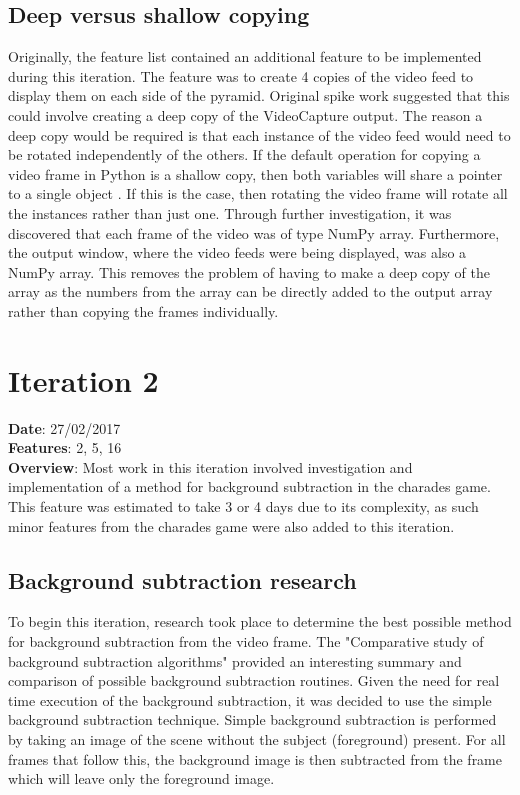\subsection{Deep versus shallow copying}
Originally, the feature list contained an additional feature to be implemented during this iteration. The feature was to create 4 copies of the video feed to display them on each side of the pyramid. Original spike work suggested that this could involve creating a deep copy of the VideoCapture output. The reason a deep copy would be required is that each instance of the video feed would need to be rotated independently of the others. If the default operation for copying a video frame in Python is a shallow copy, then both variables will share a pointer to a single object \cite{deep_shallow_copying}. If this is the case, then rotating the video frame will rotate all the instances rather than just one. Through further investigation, it was discovered that each frame of the video was of type NumPy array. Furthermore, the output window, where the video feeds were being displayed, was also a NumPy array. This removes the problem of having to make a deep copy of the array as the numbers from the array can be directly added to the output array rather than copying the frames individually.

\newpage

\section{Iteration 2}
\textbf{Date}: 27/02/2017 \\
\textbf{Features}: 2, 5, 16 \\
\textbf{Overview}: Most work in this iteration involved investigation and implementation of a method for background subtraction in the charades game. This feature was estimated to take 3 or 4 days due to its complexity, as such minor features from the charades game were also added to this iteration.

\subsection{Background subtraction research}
To begin this iteration, research took place to determine the best possible method for background subtraction from the video frame. The "Comparative study of background subtraction algorithms" \cite{background_subtraction_comparison} provided an interesting summary and comparison of possible background subtraction routines. Given the need for real time execution of the background subtraction, it was decided to use the simple background subtraction technique. Simple background subtraction is performed by taking an image of the scene without the subject (foreground) present. For all frames that follow this, the background image is then subtracted from the frame which will leave only the foreground image.

